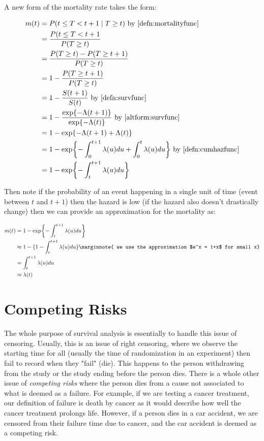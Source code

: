 \documentclass[10pt]{article}
\begin{document}
\begin{lemma}
\label{altform:mortalityfunc}
A new form of the mortality rate takes the form:

\begin{align*}
    m(t) &= P(t\leq T < t+1 \mid T\geq t) \text{ by \cref{defn:mortalityfunc}}\\
    &= \frac{P(t\leq T < t+1}{P(T\geq t)}\\
    &= \frac{P(T\geq t) - P(T\geq t+1)}{P(T\geq t)}\\
    &= 1- \frac{P(T\geq t+1)}{P(T\geq t)}\\
    &= 1 - \frac{S(t+1)}{S(t)} \text{ by \cref{defn:survfunc}}\\
    &= 1- \frac{\exp{-\Lambda(t+1)}}{\exp{-\Lambda(t)}} \text{ by \cref{altform:survfunc}}\\
    &= 1-\exp{-\Lambda(t+1) + \Lambda(t)}\\
    &= 1- \exp{-\int_0^{t+1}\lambda(u)du + \int_0^t\lambda(u)du} \text{ by \cref{defn:cumhazfunc}}\\
    &= 1- \exp{-\int_t^{t+1}\lambda(u)du}
\end{align*}

Then note if the probability of an event happening in a single unit of time (event between $t$ and $t+1$) then the hazard is low (if the hazard also doesn't drastically change) then we can provide an approximation for the mortality as:

\begin{align*}
    m(t) &= 1- \exp{-\int_t^{t+1}\lambda(u)du}\\
    &\approx 1-\{1-\int_t^{t+1}\lambda(u)du\} \marginnote{ we use the approximation $e^x = 1+x$ for small x}\\
    &= \int_t^{t+1}\lambda(u)du\\
    &\approx \lambda(t)
\end{align*}

\end{lemma}

\section{Competing Risks}

The whole purpose of survival analysis is essentially to handle this issue of censoring. Usually, this is an issue of right censoring, where we observe the starting time for all (usually the time of randomization in an experiment) then fail to record when they "fail" (die). This happens to the person withdrawing from the study or the study ending before the person dies. There is a whole other issue of \textit{competing risks} where the person dies from a cause not associated to what is deemed as a failure. For example, if we are testing a cancer treatment, our definition of failure is death by cancer as it would describe how well the cancer treatment prolongs life. However, if a person dies in a car accident, we are censored from their failure time due to cancer, and the car accident is deemed as a competing risk. 
\end{document}
